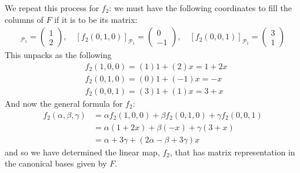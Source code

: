 {\noindent We repeat this process for $f_2$: we must have the following coordinates to fill the columns of $F$ if it is to be its matrix:
\begin{align*}
[f_2(1,0,0)]_{\mathcal{P}_1} = \begin{pmatrix} 1 \\ 2 \end{pmatrix}, \quad [f_2(0,1,0)]_{\mathcal{P}_1} = \begin{pmatrix} 0 \\-1 \end{pmatrix}, \quad [f_2(0,0,1)]_{\mathcal{P}_1} = \begin{pmatrix} 3 \\ 1 \end{pmatrix}
\end{align*}
This unpacks as the following
\begin{align*}
& f_2(1,0,0) = (1)1 + (2)x = 1+2x \\
& f_2(0,1,0) = (0)1 + (-1)x = -x \\
& f_2(0,0,1) = (3)1 + (1)x = 3+x
\end{align*}
And now the general formula for $f_2$:
\begin{align*}
f_2(\alpha,\beta,\gamma) &= \alpha f_2(1,0,0) + \beta f_2(0,1,0) + \gamma f_2(0,0,1) \\
           &= \alpha(1+2x) + \beta(-x) + \gamma (3+x) \\
           &= \alpha + 3\gamma + (2\alpha - \beta + 3\gamma)x
\end{align*}
and so we have determined the linear map, $f_2$, that has matrix representation in the canonical bases given by $F$. \\

}
